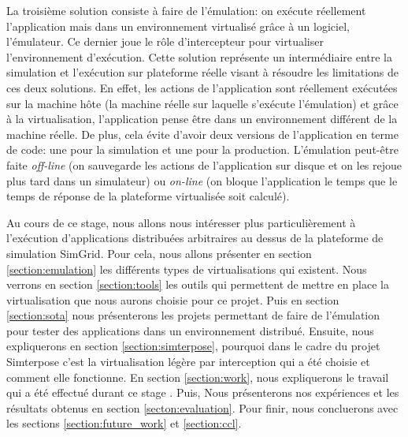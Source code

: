 La troisième solution consiste à faire de l'émulation: on exécute réellement
l'application mais dans un environnement virtualisé grâce à un logiciel,
l'émulateur. Ce dernier joue le rôle d'intercepteur pour virtualiser
l'environnement d'exécution.
Cette solution représente un intermédiaire entre la simulation et l'exécution
sur plateforme réelle visant à résoudre les limitations de ces deux
solutions. En effet, les actions de l'application sont réellement exécutées sur
la machine hôte (la machine réelle sur laquelle s'exécute l'émulation) et grâce
à la virtualisation, l'application pense être dans un environnement différent de
la machine réelle. De plus, cela évite d'avoir deux versions de l'application en
terme de code: une pour la simulation et une pour la production. L'émulation
peut-être faite \textit{off-line} (on sauvegarde les actions de l'application
sur disque et on les rejoue plus tard dans un simulateur) ou \textit{on-line}
(on bloque l'application le temps que le temps de réponse de la plateforme
virtualisée soit calculé).


Au cours de ce stage, nous allons nous intéresser plus particulièrement à
l'exécution d'applications distribuées arbitraires au dessus de la plateforme de
simulation SimGrid. Pour cela, nous allons présenter en section
\ref{section:emulation} les différents types de virtualisations qui
existent. Nous verrons en section \ref{section:tools} les outils qui permettent
de mettre en place la virtualisation que nous aurons choisie pour ce
projet. Puis en section \ref{section:sota} nous présenterons les projets
permettant de faire de l'émulation pour tester des applications dans un
environnement distribué. Ensuite, nous expliquerons en section
\ref{section:simterpose}, pourquoi dans le cadre du projet Simterpose c'est la
virtualisation légère par interception qui a été choisie et comment elle
fonctionne. En section \ref{section:work}, nous expliquerons le travail qui a
été effectué durant ce stage . Puis, Nous présenterons nos expériences et les
résultats obtenus en section \ref{secton:evaluation}. Pour finir, nous
concluerons avec les sections \ref{section:future_work} et \ref{section:ccl}.

